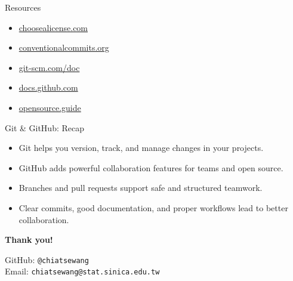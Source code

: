 \documentclass[12pt]{beamer}
\begin{document}
\begin{frame}{Resources}
  \begin{itemize}
    \setlength\itemsep{1em}
    \item \href{https://choosealicense.com}{choosealicense.com}
    \item \href{https://www.conventionalcommits.org/en/v1.0.0/}{conventionalcommits.org}
    \item \href{https://git-scm.com/doc}{git-scm.com/doc}
    \item \href{https://docs.github.com}{docs.github.com}
    \item \href{https://opensource.guide/}{opensource.guide}
  \end{itemize}
\end{frame}

\begin{frame}{Git \& GitHub: Recap}
  \begin{itemize}
    \setlength\itemsep{1em}
    \item Git helps you version, track, and manage changes in your projects.
    \item GitHub adds powerful collaboration features for teams and open source.
    \item Branches and pull requests support safe and structured teamwork.
    \item Clear commits, good documentation, and proper workflows lead to better collaboration.
  \end{itemize}
\end{frame}

\begin{frame}
  \vfill
  \centering
  {\LARGE \textbf{Thank you!}} \par
  \vfill

  \begin{minipage}{0.7\linewidth}
    \raggedright
    \small
    GitHub: \texttt{@chiatsewang} \\
    Email: \texttt{chiatsewang@stat.sinica.edu.tw}
  \end{minipage}
\end{frame}
\end{document}
